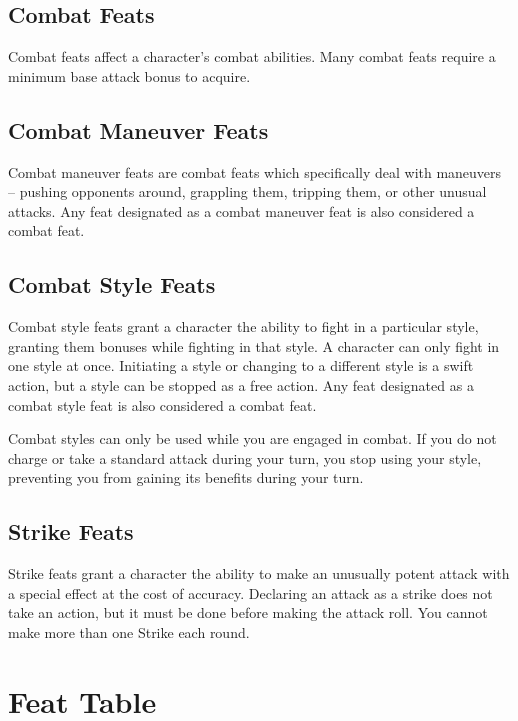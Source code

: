 \subsection{Combat Feats}
Combat feats affect a character's combat abilities. Many combat feats require a minimum base attack bonus to acquire.

\subsection{Combat Maneuver Feats}
Combat maneuver feats are combat feats which specifically deal with maneuvers -- pushing opponents around, grappling them, tripping them, or other unusual attacks. Any feat designated as a combat maneuver feat is also considered a combat feat.

\subsection{Combat Style Feats}
Combat style feats grant a character the ability to fight in a particular style, granting them bonuses while fighting in that style. A character can only fight in one style at once. Initiating a style or changing to a different style is a swift action, but a style can be stopped as a free action. Any feat designated as a combat style feat is also considered a combat feat.

Combat styles can only be used while you are engaged in combat. If you do not charge or take a standard attack during your turn, you stop using your style, preventing you from gaining its benefits during your turn.

\subsection{Strike Feats}\label{Strike Feats}
Strike feats grant a character the ability to make an unusually potent attack with a special effect at the cost of accuracy. Declaring an attack as a strike does not take an action, but it must be done before making the attack roll. You cannot make more than one Strike each round.

\onecolumn
\section{Feat Table}

